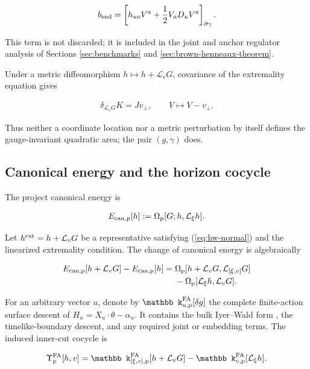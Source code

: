 \begin{align}
b_{\rm end}
=\left[h_{ua}V^a+\frac12V_aD_uV^a\right]_{\partial\gamma}. \label{eq:area-endpoint}
\end{align}

This term is not discarded; it is included in the joint and anchor regulator analysis of Sections \ref{sec:benchmarks} and \ref{sec:brown-henneaux-theorem}.

Under a metric diffeomorphism $h\mapsto h+\mathcal L_vG$, covariance of the extremality equation gives

\begin{align}
\delta_{\mathcal L_vG}K=Jv_\perp,
\qquad
V\mapsto V-v_\perp .
\end{align}

Thus neither a coordinate location nor a metric perturbation by itself defines the gauge-invariant quadratic area; the pair $(g,\gamma)$ does.

\subsection{Canonical energy and the horizon cocycle}\label{subsec:horizon-cocycle}

The project canonical energy is

\begin{align}
E_{{\rm can,p}}[h]
:=\Omega_{\rm p}[G;h,\mathcal L_\xi h].
\end{align}

Let $h^{\rm ext}=h+\mathcal L_vG$ be a representative satisfying (\ref{eq:hw-normal}) and the linearized extremality condition. The change of canonical energy is algebraically

\[\begin{aligned}
E_{{\rm can,p}}[h+\mathcal L_vG]-E_{{\rm can,p}}[h]
={}&\Omega_{\rm p}
[h+\mathcal L_vG,\mathcal L_{[\xi,v]}G]\\
&-\Omega_{\rm p}[\mathcal L_\xi h,\mathcal L_vG].
\end{aligned}\]

For an arbitrary vector $u$, denote by $\mathbb k^{\rm FA}_{u,\rm p}[\delta g]$ the complete finite-action surface descent of $H_u=X_u\cdot\theta-\alpha_u$. It contains the bulk Iyer--Wald form \cite{Iyer:1994ys}, the timelike-boundary descent, and any required joint or embedding terms. The induced inner-cut cocycle is

\begin{align}
\Upsilon_{\rm p}^{\rm FA}[h,v]
=\mathbb k^{\rm FA}_{[\xi,v],\rm p}
[h+\mathcal L_vG]
-\mathbb k^{\rm FA}_{v,\rm p}[\mathcal L_\xi h]. \label{eq:finite-action-upsilon}
\end{align}

